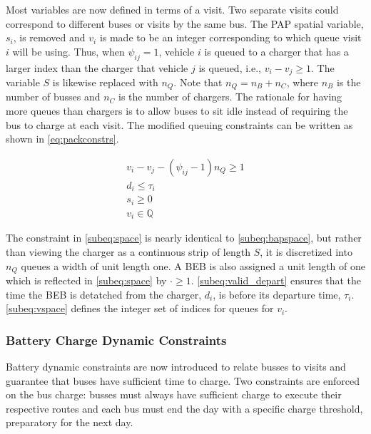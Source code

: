 \documentclass[ee,msthesis]{usuthesis}
\begin{document}
Most variables are now defined in terms of a visit. Two separate visits could correspond to different buses or visits by
the same bus. The PAP spatial variable, \(s_i\), is removed and \(v_i\) is made to be an integer corresponding to which
queue visit \(i\) will be using. Thus, when \(\psi_{ij} = 1\), vehicle \(i\) is queued to a charger that has a larger index than
the charger that vehicle \(j\) is queued, i.e., \(v_i-v_j \geq 1\). The variable \(S\) is likewise replaced with \(n_Q\). Note that
\(n_Q = n_B + n_C\), where \(n_B\) is the number of busses and \(n_C\) is the number of chargers. The rationale for having
more queues than chargers is to allow buses to sit idle instead of requiring the bus to charge at each visit. The
modified queuing constraints can be written as shown in \autoref{eq:packconstrs}.

\begin{subequations}
\label{eq:packconstrs}
\begin{align}
    v_i - v_j - (\psi_{ij} - 1)n_Q \geq 1       \label{subeq:space}        \\
    d_i \leq \tau_i                             \label{subeq:valid_depart} \\
    s_i \geq 0                               \label{subeq:pos_charge} \\
    v_i \in \mathbb{Q}                       \label{subeq:vspace}
\end{align}
\end{subequations}

The constraint in \autoref{subeq:space} is nearly identical to \autoref{subeq:bapspace}, but rather than viewing the
charger as a continuous strip of length \(S\), it is discretized into \(n_Q\) queues a width of unit length one. A BEB is
also assigned a unit length of one which is reflected in \autoref{subeq:space} by \(\cdot \geq 1\). \autoref{subeq:valid_depart}
ensures that the time the BEB is detatched from the charger, \(d_i\), is before its departure time, \(\tau_i\).
\autoref{subeq:vspace} defines the integer set of indices for queues for \(v_i\).

\subsubsection{Battery Charge Dynamic Constraints}
\label{sec:batt_dynamics}
Battery dynamic constraints are now introduced to relate busses to visits and guarantee that buses have sufficient time
to charge. Two constraints are enforced on the bus charge: busses must always have sufficient charge to execute their
respective routes and each bus must end the day with a specific charge threshold, preparatory for the next day.
\end{document}
